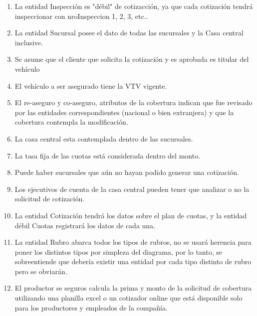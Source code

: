 \documentclass[a4paper,11pt]{article}
\begin{document}
\begin{enumerate}
 
	\item La entidad Inspección es "débil" de cotizacción, ya que cada cotización tendrá inspeccionar con nroInspeccion 1, 2, 3, etc..
 
	\item La entidad Sucursal posee el dato de todas las sucursales y la Casa central inclusive.

	\item Se asume que el cliente que solicita la cotización y es aprobada es titular del vehículo
	
	\item El vehículo a ser asegurado tiene la VTV vigente.

	\item El re-aseguro y co-aseguro, atributos de la cobertura indican que fue revisado por las entidades correspondientes (nacional o bien extranjera) y que la cobertura contempla la modificación.

	\item La casa central esta contemplada dentro de las sucursales.

	\item La tasa fija de las cuotas está considerada dentro del monto.

	\item Puede haber sucursales que aún no hayan podido generar una cotización.

	\item Los ejecutivos de cuenta de la casa central pueden tener que analizar o no la solicitud de cotización.  

	\item La entidad Cotización tendrá los datos sobre el plan de cuotas, y la entidad débil Cuotas registrará los datos de cada una.
 
	\item La entidad Rubro abarca todos los tipos de rubros, no se usará herencia para poner los distintos tipos por simpleza del diagrama, por lo tanto, se sobreentiende que debería existir una entidad por cada tipo distinto de rubro pero se obviarán.
	
	\item El productor se seguros calcula la prima y monto de la solicitud de cobertura utilizando una planilla excel o un cotizador online que está disponible solo para los productores y empleados de la compañía.
  
\end{enumerate}
\end{document}
